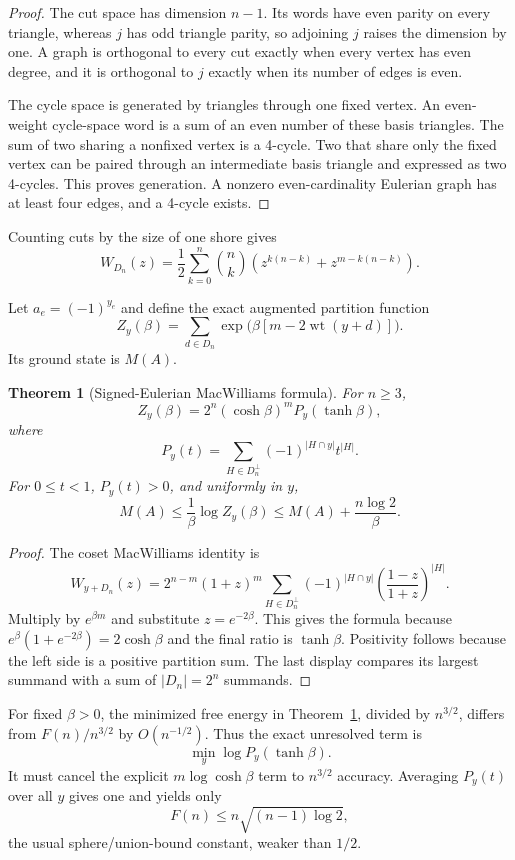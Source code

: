 \documentclass[11pt]{article}
\newtheorem{theorem}{Theorem}
\DeclareMathOperator{\wt}{wt}
\begin{document}
\begin{proof}
The cut space has dimension \(n-1\).  Its words have even parity on every
triangle, whereas \(j\) has odd triangle parity, so adjoining \(j\) raises the
dimension by one.  A graph is orthogonal to every cut exactly when every
vertex has even degree, and it is orthogonal to \(j\) exactly when its number
of edges is even.

The cycle space is generated by triangles through one fixed vertex.  An
even-weight cycle-space word is a sum of an even number of these basis
triangles.  The sum of two sharing a nonfixed vertex is a 4-cycle.  Two that
share only the fixed vertex can be paired through an intermediate basis
triangle and expressed as two 4-cycles.  This proves generation.  A nonzero
even-cardinality Eulerian graph has at least four edges, and a 4-cycle exists.
\end{proof}

Counting cuts by the size of one shore gives
\begin{equation}
 W_{D_n}(z)=\frac12\sum_{k=0}^n\binom nk
 \left(z^{k(n-k)}+z^{m-k(n-k)}\right).
 \label{eq:weightenum}
\end{equation}

Let \(a_e=(-1)^{y_e}\) and define the exact augmented partition function
\[
 Z_y(\beta)=\sum_{d\in D_n}
 \exp\bigl(\beta[m-2\wt(y+d)]\bigr).
\]
Its ground state is \(M(A)\).

\begin{theorem}[Signed-Eulerian MacWilliams formula]
\label{thm:macwilliams}
For \(n\ge3\),
\[
 Z_y(\beta)=2^n(\cosh\beta)^mP_y(\tanh\beta),
\]
where
\[
 P_y(t)=\sum_{H\in D_n^\perp}(-1)^{|H\cap y|}t^{|H|}.
\]
For \(0\le t<1\), \(P_y(t)>0\), and uniformly in \(y\),
\[
 M(A)\le\frac1\beta\log Z_y(\beta)
 \le M(A)+\frac{n\log2}\beta.
\]
\end{theorem}

\begin{proof}
The coset MacWilliams identity is
\[
 W_{y+D_n}(z)=2^{n-m}(1+z)^m
 \sum_{H\in D_n^\perp}(-1)^{|H\cap y|}
 \left(\frac{1-z}{1+z}\right)^{|H|}.
\]
Multiply by \(e^{\beta m}\) and substitute \(z=e^{-2\beta}\).  This gives
the formula because
\(e^{\beta}(1+e^{-2\beta})=2\cosh\beta\) and the final ratio is
\(\tanh\beta\).  Positivity follows because the left side is a positive
partition sum.  The last display compares its largest summand with a sum of
\(|D_n|=2^n\) summands.
\end{proof}

For fixed \(\beta>0\), the minimized free energy in
Theorem~\ref{thm:macwilliams}, divided by \(n^{3/2}\), differs from
\(F(n)/n^{3/2}\) by \(O(n^{-1/2})\).  Thus the exact unresolved term is
\[
 \min_y\log P_y(\tanh\beta).
\]
It must cancel the explicit \(m\log\cosh\beta\) term to \(n^{3/2}\)
accuracy.  Averaging \(P_y(t)\) over all \(y\) gives one and yields only
\[
 F(n)\le n\sqrt{(n-1)\log2},
\]
the usual sphere/union-bound constant, weaker than \(1/2\).
\end{document}
